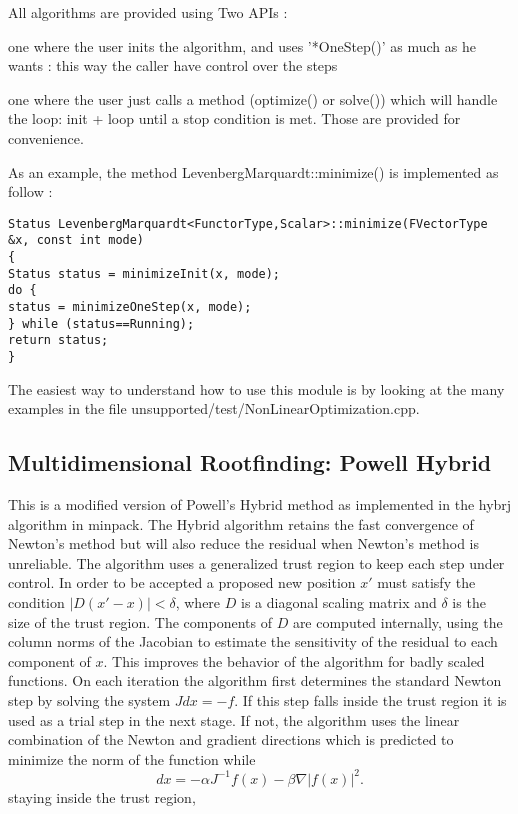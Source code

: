 All algorithms are provided using Two APIs :

one where the user inits the algorithm, and uses '*OneStep()' as much as he wants : this way the caller have control over the steps

one where the user just calls a method (optimize() or solve()) which will handle the loop: init + loop until a stop condition is met. Those are provided for convenience.

As an example, the method LevenbergMarquardt::minimize() is implemented as follow :

\begin{lstlisting}
Status LevenbergMarquardt<FunctorType,Scalar>::minimize(FVectorType &x, const int mode)
{
Status status = minimizeInit(x, mode);
do {
status = minimizeOneStep(x, mode);
} while (status==Running);
return status;
}
\end{lstlisting}


The easiest way to understand how to use this module is by looking at the many examples in the file unsupported/test/NonLinearOptimization.cpp. 

\subsection{Multidimensional Rootfinding: Powell Hybrid}
This is a modified version of Powell’s Hybrid method as implemented in the hybrj
algorithm in minpack.  The Hybrid algorithm retains the fast convergence of Newton’s
method but will also reduce the residual when Newton’s method is unreliable.
The algorithm uses a generalized trust region to keep each step under control. In order
to be accepted a proposed new position $x′$ must satisfy the condition $|D(x′ −x)| < \delta$,
where $D$ is a diagonal scaling matrix and $\delta$ is the size of the trust region. The
components of $D$ are computed internally, using the column norms of the Jacobian
to estimate the sensitivity of the residual to each component of $x$. This improves the
behavior of the algorithm for badly scaled functions.
On each iteration the algorithm first determines the standard Newton step by solving
the system $Jdx = −f$. If this step falls inside the trust region it is used as a trial step
in the next stage. If not, the algorithm uses the linear combination of the Newton
and gradient directions which is predicted to minimize the norm of the function while
\begin{equation}
	dx = −\alpha J^{−1}f(x) − \beta\nabla|f(x)|^2.
\end{equation}
staying inside the trust region,

